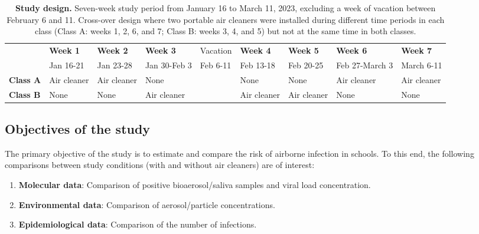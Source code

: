 \documentclass{article}
\begin{document}
\begin{table}[!htpb]
    \footnotesize
    \centering
    \caption{\textbf{Study design.} Seven-week study period from January 16 to March 11, 2023, excluding a week of vacation between February 6 and 11. Cross-over design where two portable air cleaners were installed during different time periods in each class (Class A: weeks 1, 2, 6, and 7; Class B: weeks 3, 4, and 5) but not at the same time in both classes.}
    \begin{tabular}{l l l l l l l l l}
    \toprule
      & \textbf{Week 1} & \textbf{Week 2} & \textbf{Week 3} & Vacation & \textbf{Week 4} & \textbf{Week 5} & \textbf{Week 6} & \textbf{Week 7} \\
      & Jan 16-21 & Jan 23-28 & Jan 30-Feb 3 & Feb 6-11 & Feb 13-18 & Feb 20-25 & Feb 27-March 3 & March 6-11 \\
      \midrule
      \textbf{Class A} & \cellcolor{gray!50} Air cleaner & \cellcolor{gray!50} Air cleaner & \cellcolor{gray!10} None & & \cellcolor{gray!10} None & \cellcolor{gray!10} None & \cellcolor{gray!50} Air cleaner & \cellcolor{gray!50} Air cleaner \\
      \textbf{Class B} & \cellcolor{gray!10} None & \cellcolor{gray!10} None & \cellcolor{gray!50} Air cleaner & & \cellcolor{gray!50} Air cleaner & \cellcolor{gray!50} Air cleaner & \cellcolor{gray!10} None & \cellcolor{gray!10} None \\
      \bottomrule
    \end{tabular}
    \label{tab:study_design}
\end{table}

\subsection{Objectives of the study}

The primary objective of the study is to estimate and compare the risk of airborne infection in schools. To this end, the following comparisons between study conditions (with and without air cleaners) are of interest:

\begin{enumerate}
    \item \textbf{Molecular data}: Comparison of positive bioaerosol/saliva samples and viral load concentration.
    \item \textbf{Environmental data}: Comparison of aerosol/particle concentrations.
    \item \textbf{Epidemiological data}: Comparison of the number of infections.  
\end{enumerate}
\end{document}
